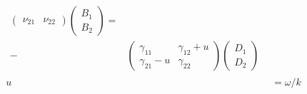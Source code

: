 \documentclass[12pt]{article}
\begin{document}
\begin{multicols}{3}
\begin{align}
\begin{split}
\begin{pmatrix}
    \nu_{21} & \nu_{22}
  \end{pmatrix}
  {}\begin{pmatrix}
    B_1\\
    B_2
  \end{pmatrix} =\\
  -&\begin{pmatrix}
    \gamma_{11} & \gamma_{12} + u\\
    \gamma_{21} - u & \gamma_{22}
  \end{pmatrix}
  \begin{pmatrix}
      D_1\\
      D_2
  \end{pmatrix}
  \end{split}\\
  u &= \omega / k
\end{align}



\end{multicols}
\end{document}
